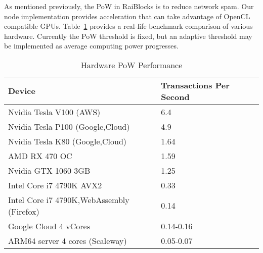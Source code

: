 As mentioned previously, the PoW in RaiBlocks is to reduce network spam.  Our node implementation provides acceleration that can take advantage of OpenCL compatible GPUs. Table~\ref{table:hardware_pow} provides a real-life benchmark comparison of various hardware. Currently the PoW threshold is fixed, but an adaptive threshold may be implemented as average computing power progresses.

\begin{table}[!ht]
\centering
\caption{Hardware PoW Performance}
\label{table:hardware_pow}
\begin{tabular}{ll}
Device                                    & Transactions Per Second \\
\hline
Nvidia Tesla V100 (AWS)                   & 6.4                     \\
Nvidia Tesla P100 (Google,Cloud)          & 4.9                     \\
Nvidia Tesla K80 (Google,Cloud)           & 1.64                    \\
AMD RX 470 OC                             & 1.59                    \\
Nvidia GTX 1060 3GB                       & 1.25                    \\
Intel Core i7 4790K AVX2                  & 0.33                    \\
Intel Core i7 4790K,WebAssembly (Firefox) & 0.14                    \\
Google Cloud 4 vCores                     & 0.14-0.16               \\
ARM64 server 4 cores (Scaleway)           & 0.05-0.07               \\
\end{tabular}
\end{table}
